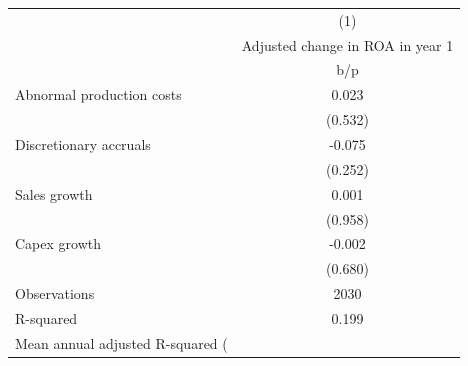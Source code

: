 {
\def\sym#1{\ifmmode^{#1}\else\(^{#1}\)\fi}
\begin{tabular}{l*{1}{c}}
\hline\hline
                    &\multicolumn{1}{c}{(1)}\\
                    &\multicolumn{1}{c}{Adjusted change in ROA in year 1}\\
                    &         b/p   \\
\hline
Abnormal production costs&       0.023   \\
                    &     (0.532)   \\
Discretionary accruals&      -0.075   \\
                    &     (0.252)   \\
Sales growth        &       0.001   \\
                    &     (0.958)   \\
Capex growth        &      -0.002   \\
                    &     (0.680)   \\
\hline
Observations        &        2030   \\
R-squared           &       0.199   \\
Mean annual adjusted R-squared (%
\hline\hline
\end{tabular}
}
